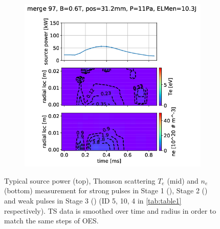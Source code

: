 \begin{figure}[!ht]
\begin{subfigure}{0.285\textwidth}
         \vspace*{-55mm}
         {\color{white}\caption{\phantom{ }}\label{fig:TSa}}
     \end{subfigure}
     \hfill
     \begin{subfigure}{0.341\textwidth}
         \centering
         \vspace*{-0mm}
         \includegraphics[width=\textwidth,trim={110 0 70 25},clip]{Chapters/chapter3/figs/pass_1_merge97_global_fit41.png}
         \vspace*{-55mm}
         {\color{white}\caption{\phantom{ }}\label{fig:TSc}}
     \end{subfigure}
        \vspace*{+45mm}
        \caption{Typical source power (top), Thomson scattering $T_e$ (mid) and $n_e$ (bottom) measurement for strong pulses in Stage 1 (), Stage 2 () and weak pulses in Stage 3 () (ID 5, 10, 4 in \autoref{tab:table1} respectively). TS data is smoothed over time and radius in order to match the same steps of OES.
        }
        \label{fig:TS1}
\end{figure}

